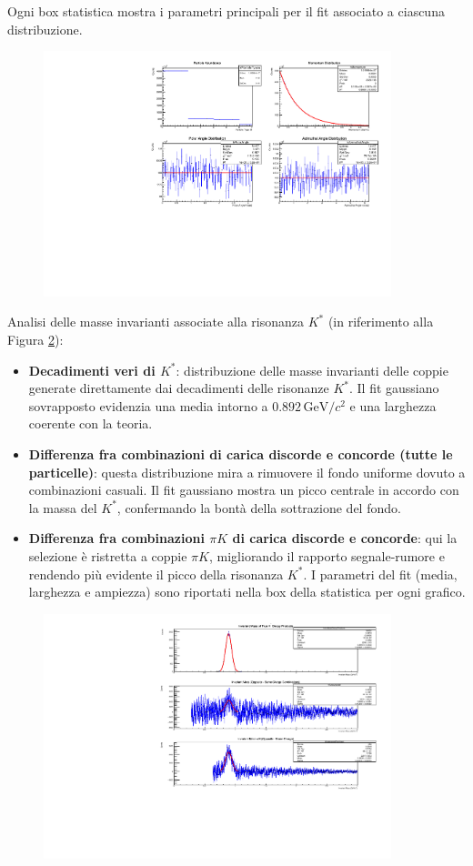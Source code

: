 \documentclass[a4paper,11pt]{article}
\begin{document}
Ogni box statistica mostra i parametri principali per il fit associato a ciascuna distribuzione.

\begin{figure}[h!]
    \centering
    \includegraphics[width=0.9\textwidth]{distributions.pdf}
    \caption{}
    \label{fig:distribuzioni}
\end{figure}

\clearpage

Analisi delle masse invarianti associate alla risonanza \( K^* \) (in riferimento alla Figura \ref{fig:kstar}):
\begin{itemize}
    \item \textbf{Decadimenti veri di \( K^* \)}: distribuzione delle masse invarianti delle coppie generate direttamente dai decadimenti delle risonanze \( K^* \). Il fit gaussiano sovrapposto evidenzia una media intorno a \( 0.892 \, \mathrm{GeV}/c^2 \) e una larghezza coerente con la teoria.
    \item \textbf{Differenza fra combinazioni di carica discorde e concorde (tutte le particelle)}: questa distribuzione mira a rimuovere il fondo uniforme dovuto a combinazioni casuali. Il fit gaussiano mostra un picco centrale in accordo con la massa del \( K^* \), confermando la bontà della sottrazione del fondo.
    \item \textbf{Differenza fra combinazioni \( \pi K \) di carica discorde e concorde}: qui la selezione è ristretta a coppie \( \pi K \), migliorando il rapporto segnale-rumore e rendendo più evidente il picco della risonanza \( K^* \). I parametri del fit (media, larghezza e ampiezza) sono riportati nella box della statistica per ogni grafico.
\end{itemize}

\begin{figure}[h!]
    \centering
    \includegraphics[width=0.9\textwidth]{invariant_mass_distributions.pdf}
    \caption{}
    \label{fig:kstar}
\end{figure}
\end{document}
